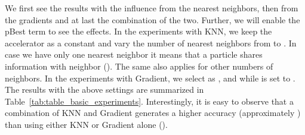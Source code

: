 \documentclass{ieeeaccess}
\begin{document}
We first see the results with the influence from the nearest neighbors, then from the gradients and at last the combination of the two. Further, we will enable the pBest term to see the effects.  In the experiments with KNN, we keep the accelerator  as a constant  and vary the number of nearest neighbors from  to . In case we have only one nearest neighbor it means that a particle shares information with  neighbor (). The same also applies for other numbers of neighbors. In the experiments with Gradient, we select  as ,  and  while  is set to . 
The results with the above settings are summarized in Table~\ref{tab:table_basic_experiments}. Interestingly, it is easy to observe that a combination of KNN and Gradient generates a higher accuracy (approximately ) than using either KNN or Gradient alone ().

\begin{table}
\centering
\caption{Accuracy on Cifar-10 for the Dynamics 1. Effects of KNN and Gradient are evaluated separately besides combination of the two. Results with pBest are also included. In all experiments,  is kept at }
\label{tab:table_basic_experiments}
\end{table} 
\end{document}

